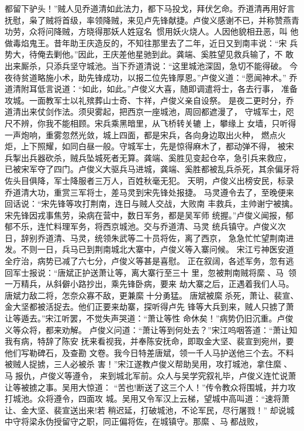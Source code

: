 都留下驴头！”贼人见乔道清如此法力，都下马投戈，拜伏乞命。乔道清再用好言
抚慰，枭了贼将首级，率领降贼，来见卢先锋献捷。卢俊义感谢不已，并称赞燕青
功劳，众将问降贼，方晓得那妖人姓寇名，惯用妖火烧人。人因他貌相丑恶，叫
他做毒焰鬼王。昔年助王庆造反的，不知往那里去了二年，近日又到南丰说：“宋
兵势大，待俺去剿他。”因此，王庆差他星驰到此。龚端、奚胜望见救兵输了，不
敢出来厮杀，只添兵坚守城池。当下乔道清说：“这里城池深固，急切不能得破。
今夜待贫道略施小术，助先锋成功，以报二位先锋厚恩。”卢俊义道：“愿闻神术。”
乔道清附耳低言说道：“如此，如此。”卢俊义大喜，随即调遣将士，各去行事，
准备攻城。一面教军士以礼殡葬山士奇、卞祥，卢俊义亲自设祭。
是夜二更时分，乔道清出来仗剑作法。须臾雾起，把西京一座城池，周回都遮漫了，
守城军士，咫尺不辨，你我不能相顾。宋兵乘黑暗里，从飞桥转关辘上，攀缘上
女墙，只听得一声炮响，重雾忽然光敛，城上四面，都是宋兵，各向身边取出火种，
燃点火炬，上下照耀，如同白昼一般。守城军士，先是惊得麻木了，都动弹不得，
被宋兵掣出兵器砍杀，贼兵坠城死者无算。龚端、奚胜见变起仓卒，急引兵来救应，
已被宋军夺了四门。卢俊义大驱兵马进城，龚端、奚胜都被乱兵杀死，其余偏牙将
佐头目俱降，军士降服者三万人，百姓秋毫无犯。
天明，卢俊义出榜安民，标录乔道清大功，重赏三军将士，差马灵到宋先锋处报捷。
马灵遵令去了，至晚便来回话说：“宋先锋等攻打荆南，连日与贼人交战，大败南
丰救兵，主帅谢宁被擒。宋先锋因戎事焦劳，染病在营中，数日军务，都是吴军师
统握。”卢俊义闻报，郁郁不乐，连忙料理军务，将西京城池。交与乔道清、马灵
统兵镇守。卢俊义次日，辞别乔道清、马灵，统领朱武等二十员将佐，离了西京，
急急忙忙望荆南进发。不则一日，兵马已到荆南城北大寨中，卢俊义等入寨问候。
宋江亏神医安道全疗治，病势已减了六七分，卢俊义等甚是喜慰。
正在叙阔，各述军务，忽有逃回军士报说：“唐斌正护送萧让等，离大寨行至三十
里，忽被荆南贼将縻、马，领一万精兵，从斜僻小路抄出，乘先锋卧病，要来
劫大寨之后，正遇着我们人马。唐斌力敌二将，怎奈众寡不敌，更兼縻十分勇猛。
唐斌被縻杀死，萧让、裴宣、金大坚都被活捉去。他们正要来劫寨，探听得卢先
锋等大兵到来，贼人只掳了萧让等遁去。”宋江听罢，不觉失声哭道：“萧让等性
命休矣！”病势仍旧沉重。卢俊义等众将，都来劝解。
卢俊义问道：“萧让等到何处去？”宋江呜咽答道：“萧让知我有病，特辞了陈安
抚来看视我，并奉陈安抚命，即取金大坚、裴宣到宛州，要他们写勒碑石，及查勘
文卷。我今日特差唐斌，领一千人马护送他三个去。不料被贼人捉掳，三人必被杀
害！”宋江遂教卢俊义帮助吴用，攻打城池，拿住縻、马报仇，卢俊义等遵令，
来到城北军前。众人与吴学究叙礼毕，卢俊义连忙说萧让等被掳之事。吴用大惊道：
“苦也!断送了这三个人！”传令教众将围城，并力攻打城池。众将遵令，四面攻
城。吴用又令军汉上云梯，望城中高叫道：“速将萧让、金大坚、裴宣送出来!若
稍迟延，打破城池，不论军民，尽行屠戮！”
却说城中守将梁永伪授留守之职，同正偏将佐，在城镇守。那縻、马都战败，
